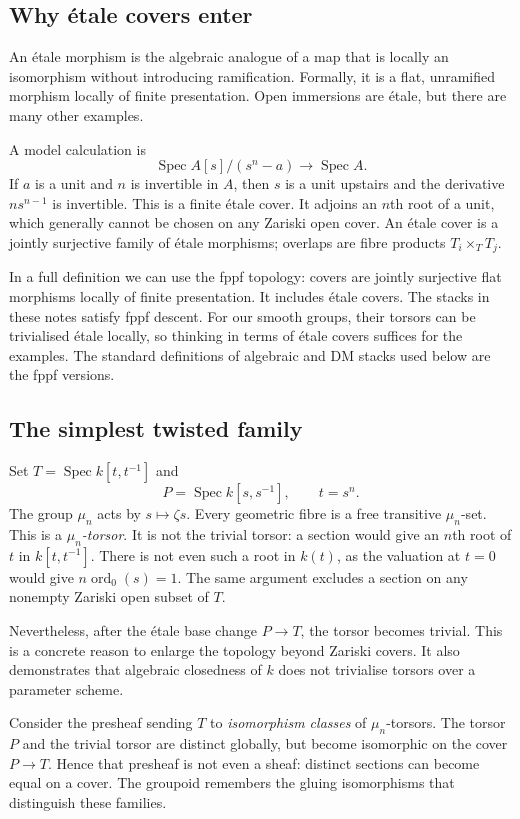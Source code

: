 \documentclass[11pt,a4paper]{article}
\numberwithin{equation}{section}
\theoremstyle{definition}
\newcommand{\Spec}{\operatorname{Spec}}
\begin{document}
\subsection{Why étale covers enter}
An étale morphism is the algebraic analogue of a map that is locally an
isomorphism without introducing ramification. Formally, it is a flat,
unramified morphism locally of finite presentation. Open immersions are étale,
but there are many other examples.

A model calculation is
\[
 \Spec A[s]/(s^n-a)\longrightarrow\Spec A.
\]
If $a$ is a unit and $n$ is invertible in $A$, then $s$ is a unit upstairs and
the derivative $ns^{n-1}$ is invertible. This is a finite étale cover. It adjoins
an $n$th root of a unit, which generally cannot be chosen on any Zariski open
cover. An étale cover is a jointly surjective family of étale morphisms;
overlaps are fibre products $T_i\times_T T_j$.

In a full definition we can use the fppf topology: covers are jointly
surjective flat morphisms locally of finite presentation. It includes étale
covers. The stacks in these notes satisfy fppf descent. For our smooth groups,
their torsors can be trivialised étale locally, so thinking in terms of étale
covers suffices for the examples. The standard definitions of algebraic and DM
stacks used below are the fppf versions.

\subsection{The simplest twisted family}
Set $T=\Spec k[t,t^{-1}]$ and
\[
 P=\Spec k[s,s^{-1}],\qquad t=s^n.
\]
The group $\mu_n$ acts by $s\mapsto\zeta s$. Every geometric fibre is a free
transitive $\mu_n$-set. This is a \emph{$\mu_n$-torsor}. It is not the trivial
torsor: a section would give an $n$th root of $t$ in $k[t,t^{-1}]$. There is
not even such a root in $k(t)$, as the valuation at $t=0$ would give
$n\operatorname{ord}_0(s)=1$. The same argument excludes a section on any
nonempty Zariski open subset of $T$.

Nevertheless, after the étale base change $P\to T$, the torsor becomes trivial.
This is a concrete reason to enlarge the topology beyond Zariski covers.
It also demonstrates that algebraic closedness of $k$ does not trivialise
torsors over a parameter scheme.

Consider the presheaf sending $T$ to \emph{isomorphism classes} of
$\mu_n$-torsors. The torsor $P$ and the trivial torsor are distinct globally,
but become isomorphic on the cover $P\to T$. Hence that presheaf is not even a
sheaf: distinct sections can become equal on a cover. The groupoid remembers
the gluing isomorphisms that distinguish these families.
\end{document}
